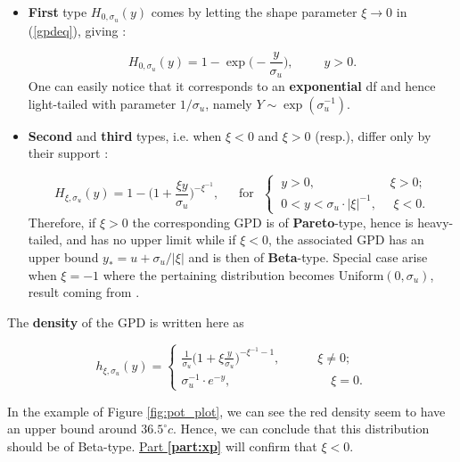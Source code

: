\begin{itemize}
	\item \textbf{First} type $H_{0,\sigma_u}(y)$ comes by letting the shape parameter $\xi\rightarrow 0$ in (\ref{gpdeq}), giving :
	
	\begin{equation}\label{gpd0}
	H_{0,\sigma_u}(y)=1-\exp
	\Big(-\frac{y}{\sigma_u}\Big), \ \ \ \ \ \ \ \ \ \ \ y>0.
	\end{equation}
	One can easily notice that it corresponds to an \textbf{exponential} df and hence light-tailed with parameter $1/ \sigma_u$, namely 
	$Y\sim\exp(\sigma_u^{-1})$.
	
	\item \textbf{Second} and \textbf{third} types, i.e. when $\xi<0$ and $\xi>0$ (resp.), differ only by their support : 
	
	\begin{equation}\label{gpdm}
	H_{\xi,\sigma_u}(y)=1-\bigg(1+\frac{\xi y}{\sigma_u}\bigg)^{-\xi^{-1}}, \ \ \ \ \  \ \ \text{for} \ \ \ \begin{cases}
	\ y>0,  \ \ \ \ \ \ \ \ \ \ \ \ \ \ \  \ \ \qquad \ \xi>0; \\
	\  0<y<\sigma_u\cdot|\xi|^{-1}, \ \ \ \  \  \  \xi<0.
	\end{cases}
	\end{equation}
	Therefore, if $\xi>0$ the corresponding GPD is of \textbf{Pareto}-type, hence is heavy-tailed, and has no upper limit while if $\xi<0$, the associated GPD has an upper bound $y_*=u+\sigma_u/|\xi|$ and is then of \textbf{Beta}-type. Special case arise when $\xi=-1$ where the pertaining distribution becomes Uniform$(0,\sigma_u)$, result coming from \citet[pp.186]{grimshaw_computing_1993}.
	
	
\end{itemize}
The \textbf{density} of the GPD is written here as

\begin{equation}\label{densgpd}
h_{\xi,\sigma_u}(y)=\begin{cases}
\frac{1}{\sigma_u}\bigg(1+\xi\frac{y}{\sigma_u}\bigg)^{-\xi^{-1}-1}, \qquad\quad \xi\neq 0; \\
\sigma_u^{-1}\cdot e^{-y},\qquad\qquad\qquad\qquad \xi= 0.
\end{cases}
\end{equation}


In the example of Figure \ref{fig:pot_plot}, we can see the red density seem to have an upper bound around $36.5^{\circ}c$. Hence, we can conclude that this distribution should be of Beta-type. \hyperref[part:xp]{Part \textbf{\ref{part:xp}}} will confirm  that $\xi<0$.

